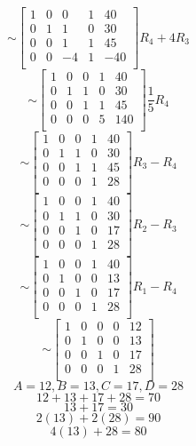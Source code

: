 \documentclass[12pt]{article}
\begin{document}
	\[\sim
		\left[
			\begin{array}{cccc|c}
			1 & 0 & 0 & 1 & 40\\
			0 & 1 & 1 & 0 & 30\\
			0 & 0 & 1 & 1 & 45\\
			0 & 0 & -4 & 1 & -40\\
			\end{array}
		\right] R_4 + 4R_3
	\]
	\[\sim
		\left[
			\begin{array}{cccc|c}
			1 & 0 & 0 & 1 & 40\\
			0 & 1 & 1 & 0 & 30\\
			0 & 0 & 1 & 1 & 45\\
			0 & 0 & 0 & 5 & 140\\
			\end{array}
		\right] \frac{1}{5} R_4
	\]
	\[\sim
		\left[
			\begin{array}{cccc|c}
			1 & 0 & 0 & 1 & 40\\
			0 & 1 & 1 & 0 & 30\\
			0 & 0 & 1 & 1 & 45\\
			0 & 0 & 0 & 1 & 28\\
			\end{array}
		\right] R_3 - R_4
	\]
	\[\sim
		\left[
			\begin{array}{cccc|c}
			1 & 0 & 0 & 1 & 40\\
			0 & 1 & 1 & 0 & 30\\
			0 & 0 & 1 & 0 & 17\\
			0 & 0 & 0 & 1 & 28\\
			\end{array}
		\right] R_2 - R_3
	\]
	\[\sim
		\left[
			\begin{array}{cccc|c}
			1 & 0 & 0 & 1 & 40\\
			0 & 1 & 0 & 0 & 13\\
			0 & 0 & 1 & 0 & 17\\
			0 & 0 & 0 & 1 & 28\\
			\end{array}
		\right] R_1 - R_4
	\]
	\[\sim
		\left[
			\begin{array}{cccc|c}
			1 & 0 & 0 & 0 & 12\\
			0 & 1 & 0 & 0 & 13\\
			0 & 0 & 1 & 0 & 17\\
			0 & 0 & 0 & 1 & 28\\
			\end{array}
		\right]
	\]
\[A = 12, B = 13, C = 17, D = 28\]
\[12 + 13 + 17 + 28 = 70\]
\[13 + 17 = 30\]
\[2(13) + 2(28) = 90\]
\[4(13) + 28 = 80\]
\end{document}
